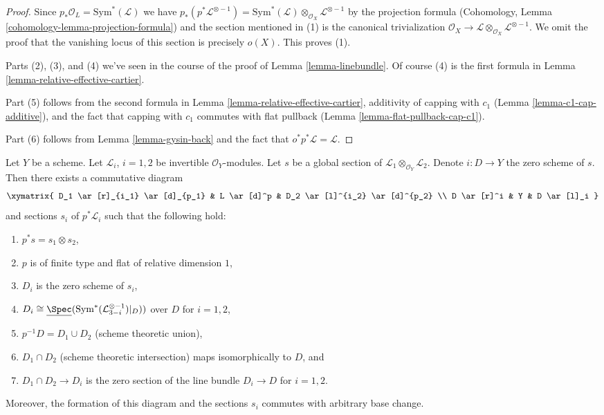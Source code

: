 \begin{proof}
Since $p_*\mathcal{O}_L = \text{Sym}^*(\mathcal{L})$ we have
$p_*(p^*\mathcal{L}^{\otimes -1}) =
\text{Sym}^*(\mathcal{L}) \otimes_{\mathcal{O}_X} \mathcal{L}^{\otimes -1}$
by the projection formula
(Cohomology, Lemma \ref{cohomology-lemma-projection-formula})
and the section mentioned in (1) is
the canonical trivialization $\mathcal{O}_X \to
\mathcal{L} \otimes_{\mathcal{O}_X} \mathcal{L}^{\otimes -1}$.
We omit the proof that the vanishing locus of
this section is precisely $o(X)$. This proves (1).

\medskip\noindent
Parts (2), (3), and (4) we've seen in the course of the proof of
Lemma \ref{lemma-linebundle}. Of course (4) is the first
formula in Lemma \ref{lemma-relative-effective-cartier}.

\medskip\noindent
Part (5) follows from the second formula in
Lemma \ref{lemma-relative-effective-cartier},
additivity of capping with $c_1$ (Lemma \ref{lemma-c1-cap-additive}),
and the fact that capping with $c_1$ commutes with flat pullback
(Lemma \ref{lemma-flat-pullback-cap-c1}).

\medskip\noindent
Part (6) follows from Lemma \ref{lemma-gysin-back}
and the fact that $o^*p^*\mathcal{L} = \mathcal{L}$.
\end{proof}

\begin{lemma}
\label{lemma-decompose-section}
Let $Y$ be a scheme. Let $\mathcal{L}_i$, $i = 1, 2$ be invertible
$\mathcal{O}_Y$-modules. Let $s$ be a global section of
$\mathcal{L}_1 \otimes_{\mathcal{O}_Y} \mathcal{L}_2$.
Denote $i : D \to Y$ the zero scheme of $s$.
Then there exists a commutative diagram
$$
\xymatrix{
D_1 \ar[r]_{i_1} \ar[d]_{p_1} &
L \ar[d]^p &
D_2 \ar[l]^{i_2} \ar[d]^{p_2} \\
D \ar[r]^i &
Y &
D \ar[l]_i
}
$$
and sections $s_i$ of $p^*\mathcal{L}_i$ such that
the following hold:
\begin{enumerate}
\item $p^*s = s_1 \otimes s_2$,
\item $p$ is of finite type and flat of relative dimension $1$,
\item $D_i$ is the zero scheme of $s_i$,
\item $D_i \cong
\underline{\Spec}(\text{Sym}^*(\mathcal{L}_{3 - i}^{\otimes -1})|_D))$
over $D$ for $i = 1, 2$,
\item $p^{-1}D = D_1 \cup D_2$ (scheme theoretic union),
\item $D_1 \cap D_2$ (scheme theoretic intersection) maps
isomorphically to $D$, and
\item $D_1 \cap D_2 \to D_i$
is the zero section of the line bundle $D_i \to D$ for $i = 1, 2$.
\end{enumerate}
Moreover, the formation of this diagram and the sections $s_i$
commutes with arbitrary base change.
\end{lemma}

